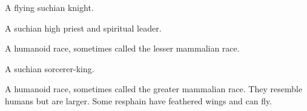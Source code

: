 \documentclass
  [a4paper,
   12pt,
   oneside
  ]%
  {article}
\begin{document}
\begin{gloss}
\begin{comment}
\paragraph{Fireborne}
\end{comment}
A flying suchian knight.



\begin{comment}
\paragraph{hierophant}
\end{comment}
A suchian high priest and spiritual leader.


\begin{comment}
\paragraph{\human}
\end{comment}
\gitem{\human}
A humanoid race, sometimes called the lesser mammalian race.






\begin{comment}
\paragraph{Mysteriarch}
\end{comment}
A suchian sorcerer-king.



\begin{comment}
\paragraph{\resphan}
\end{comment}
\gitem[\resphain]{\resphan}
A humanoid race, sometimes called the greater mammalian race.
They resemble humans but are larger. 
Some resphain have feathered wings and can fly.




\end{gloss}
\end{document}
